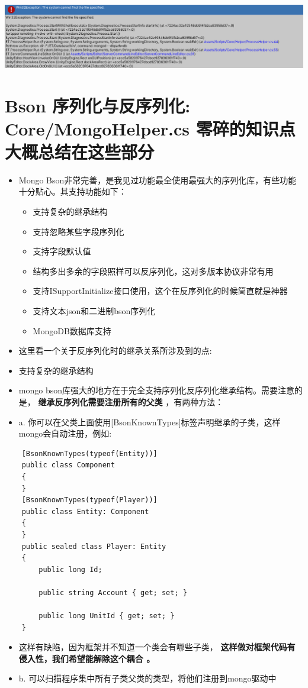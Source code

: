 \documentclass[9pt, b5paper]{article}
\begin{document}
\includegraphics[width=.9\linewidth]{./pic/readme_20230124_111807.png}

\section{Bson 序列化与反序列化: Core/MongoHelper.cs 零碎的知识点大概总结在这些部分}
\label{sec-5}
\begin{itemize}
\item Mongo Bson非常完善，是我见过功能最全使用最强大的序列化库，有些功能十分贴心。其支持功能如下：
\begin{itemize}
\item 支持复杂的继承结构
\item 支持忽略某些字段序列化
\item 支持字段默认值
\item 结构多出多余的字段照样可以反序列化，这对多版本协议非常有用
\item 支持ISupportInitialize接口使用，这个在反序列化的时候简直就是神器
\item 支持文本json和二进制bson序列化
\item MongoDB数据库支持
\end{itemize}
\item 这里看一个关于反序列化时的继承关系所涉及到的点:
\item 支持复杂的继承结构
\item mongo bson库强大的地方在于完全支持序列化反序列化继承结构。需要注意的是， \textbf{继承反序列化需要注册所有的父类} ，有两种方法：
\item a. 你可以在父类上面使用[BsonKnownTypes]标签声明继承的子类，这样mongo会自动注册，例如:
\end{itemize}
\begin{verbatim}
    [BsonKnownTypes(typeof(Entity))]
    public class Component
    {
    }
    [BsonKnownTypes(typeof(Player))]
    public class Entity: Component
    {
    }
    public sealed class Player: Entity
    {
        public long Id;

        public string Account { get; set; }

        public long UnitId { get; set; }
    }
\end{verbatim}
\begin{itemize}
\item 这样有缺陷，因为框架并不知道一个类会有哪些子类， \textbf{这样做对框架代码有侵入性，我们希望能解除这个耦合 。}
\item b. 可以扫描程序集中所有子类父类的类型，将他们注册到mongo驱动中
\end{itemize}
\end{document}

